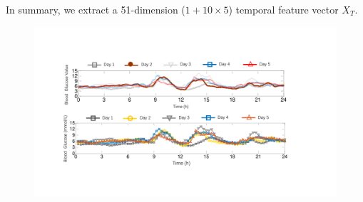 In summary, we extract a 51-dimension ($1+10\times 5$) temporal feature vector $X_T$.

\begin{figure}[h]
  \centering
  \includegraphics[width=1\columnwidth]{./img/historical_trend2.pdf}
  \caption{}
  \label{fig:historical_traces}
\end{figure}


%
%

